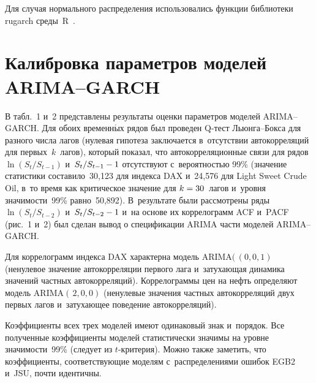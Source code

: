 \begin{multicols}{2}
  Для случая нормального распределения использовались функции 
библиотеки rugarch среды~R~\cite{8-dan}.

\vspace*{-9pt}
   
\section{Калибровка параметров моделей ARIMA--GARCH}

\vspace*{-3pt}

  В табл.~1 и~2 представлены результаты оценки параметров моделей  
ARIMA--GARCH. Для обоих временн$\acute{\mbox{ы}}$х рядов был проведен Q-тест  
Льюн\-га--Бок\-са для разного числа лагов (нулевая гипотеза заключается 
в~отсутствии автокорреляций для первых~$k$~лагов), который показал, что 
автокорреляционные связи для рядов $\ln (S_t/S_{t-1})$ и~$S_t/S_{t-1}\hm-1$ 
отсутствуют с~вероятностью 99\% (значение статистики составило~30,123 для 
индекса DAX и~24,576 для Light Sweet Crude Oil, в~то время как критическое 
значение для $k\hm=30$~лагов и~уровня значимости~99\% равно~50,892). 
В~результате были рассмотрены ряды $\ln(S_t/S_{t-2})$  
и~$S_t/S_{t-2}\hm- 1$ и~на основе их коррелограмм ACF и~PACF (рис.~1 и~2) 
был сделан вывод о спецификации ARIMA части моделей ARIMA--GARCH.
{

}

  Для коррелограмм индекса DAX характерна модель ARIMA$(\,(0,0,1)$ 
(ненулевое значение автокорреляции первого лага и~затухающая динамика 
значений частных автокорреляций). Коррелограммы цен на нефть определяют 
модель ARIMA$(\,2,0,0)$  (ненулевые значения частных автокорреляций двух 
первых лагов и~затухающее поведение автокорреляций). 
{

}
  
  Коэффициенты всех трех моделей имеют одинаковый знак и~порядок. Все 
полученные коэффициенты моделей статистически значимы на уровне 
значимости~99\% (следует из $t$-кри\-те\-рия). Можно также заметить, что 
коэффициенты, соответствующие моделям с~распределениями ошибок EGB2 
и~JSU, почти идентичны.


\end{multicols}

